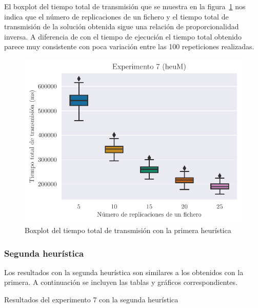 El boxplot del tiempo total de transmisión que se muestra en la figura~\ref{fig:ex7ttt} nos indica
que el número de replicaciones de un fichero y el tiempo total de transmisión de la solución obtenida
sigue una relación de proporcionalidad inversa. A diferencia de con el tiempo de ejecución el tiempo total
obtenido parece muy consistente con poca variación entre las 100 repeticiones realizadas.

\begin{figure}[H]
    \centering
    \includegraphics{include/plots/ex7_ttt_bplot.pdf}
    \caption{Boxplot del tiempo total de transmisión con la primera heurística}%
    \label{fig:ex7ttt}
\end{figure}

\subsubsection{Segunda heurística}

Los resultados con la segunda heurística son similares a los obtenidos con la primera. A continuación se incluyen las
tablas y gráficos correspondientes.

\begin{table}[H]
    \centering
    \caption{Resultados del experimento 7 con la segunda heurística}%
    \label{tab:ex7_total}
    \begin{center}
    
    \end{center}
\end{table}

